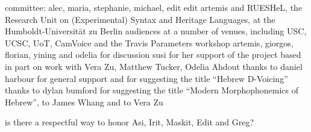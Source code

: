 \addchap{\lsAcknowledgementTitle} 

committee: alec, maria, stephanie, michael, edit
edit
artemis and RUESHeL, the Research Unit on (Experimental) Syntax and Heritage Languages, at the Humboldt-Universit\"at zu Berlin
audiences at a number of venues, including USC, UCSC, UoT, CamVoice and the Travis Parameters workshop
artemis, giorgos, florian, yining and odelia for discussion
susi for her support of the project
based in part on work with Vera Zu, Matthew Tucker, Odelia Ahdout
thanks to daniel harbour for general support and for suggesting the title ``Hebrew D-Voicing''
thanks to dylan bumford for suggesting the title ``Modern Morphophonemics of Hebrew'', to James Whang and to Vera Zu

is there a respectful way to honor Asi, Irit, Maskit, Edit and Greg?